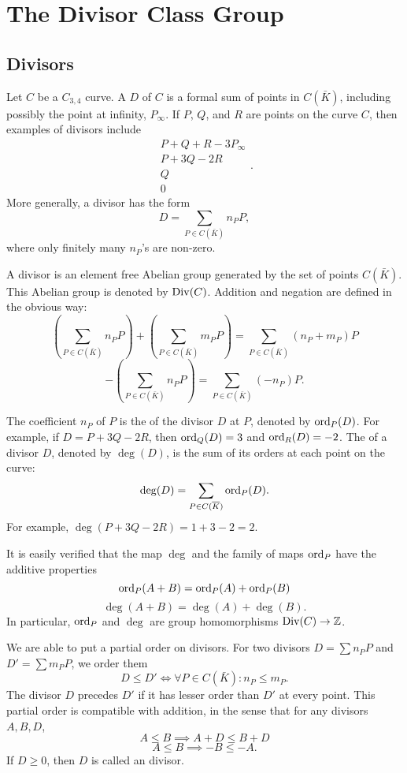 
\section{The Divisor Class Group}
\label{chap_divisors}



\subsection{Divisors}

Let $C$ be a $C_{3,4}$ curve.
A  $D$ of $C$ is a formal sum of points in $C(\bar K)$, including possibly the point at infinity, $P_\infty$.
If $P$, $Q$, and $R$ are points on the curve $C$, then examples of divisors include
  \[ \begin{array}{c} P + Q + R - 3P_\infty \\ P + 3Q - 2R \\ Q \\ 0 \end{array}. \]
More generally, a divisor has the form
  \[ D = \sum_{P \in C(\bar K)} n_P P,\]
where only finitely many $n_P$'s are non-zero.

A divisor is an element free Abelian group generated by the set of points $C(\bar K)$.
This Abelian group is denoted by $\operatorname{Div}(C)$.
Addition and negation are defined in the obvious way:
\[ \left( \sum_{P \in C(\bar K)} n_P P \right) + \left( \sum_{P \in C(\bar K)} m_P P \right) = \sum_{P \in C(\bar K)} (n_P + m_P) P \]
\[ -\left( \sum_{P \in C(\bar K)} n_P P \right) = \sum_{P \in C(\bar K)} (-n_P) P. \]

The coefficient $n_P$ of $P$ is the  of the divisor $D$ at $P$, denoted by $\operatorname{ord}_P(D)$.
For example, if $D = P + 3Q - 2R$, then $\operatorname{ord}_Q(D) = 3$ and $\operatorname{ord}_R(D) = -2$.
The  of a divisor $D$, denoted by $\deg(D)$, is the sum of its orders at each point on the curve:
  \[ \deg(D) = \sum_{P \in C(\overline K)} \operatorname{ord}_P(D). \]
For example, $\deg(P + 3Q - 2R) = 1 + 3 - 2 = 2$.

It is easily verified that the map $\deg$ and the family of maps $\operatorname{ord}_P$ have the additive properties
  \[ \operatorname{ord}_P(A + B) = \operatorname{ord}_P(A) + \operatorname{ord}_P(B) \]
  \[ \deg(A + B) = \deg(A) + \deg(B). \]
In particular, $\operatorname{ord}_P$ and $\deg$ are group homomorphisms $\operatorname{Div}(C) \to \mathbb{Z}$.

We are able to put a partial order on divisors.
For two divisors $D = \sum n_P P$ and $D' = \sum m_P P$,
we order them
  \[ D \leq D' \iff \forall P \in C(\bar K) : n_P \leq m_P. \]
The divisor $D$ precedes $D'$ if it has lesser order than $D'$ at every point.
This partial order is compatible with addition, in the sense that for any divisors $A, B, D$,
  \[ A \leq B \implies A + D \leq B + D \]
  \[ A \leq B \implies -B \leq -A. \]
If $D \geq 0$, then $D$ is called an  divisor.

